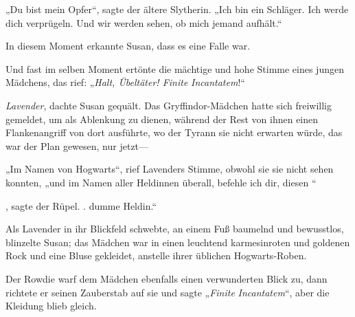 „Du bist mein Opfer“, sagte der ältere Slytherin. „Ich bin ein Schläger. Ich werde dich verprügeln. Und wir werden sehen, ob mich jemand aufhält.“

In diesem Moment erkannte Susan, dass es eine Falle war.

Und fast im selben Moment ertönte die mächtige und hohe Stimme eines jungen Mädchens, das rief: „\emph{Halt, Übeltäter! Finite} \emph{Incantatem}!“

\emph{Lavender}, dachte Susan gequält. Das Gryffindor-Mädchen hatte sich freiwillig gemeldet, um als Ablenkung zu dienen, während der Rest von ihnen einen Flankenangriff von dort ausführte, wo der Tyrann sie nicht erwarten würde, das war der Plan gewesen, nur jetzt—

„Im Namen von Hogwarts“, rief Lavenders Stimme, obwohl sie sie nicht sehen konnten, „und im Namen aller Heldinnen überall, befehle ich dir, diesen “

, sagte der Rüpel. .  dumme Heldin.“

Als Lavender in ihr Blickfeld schwebte, an einem Fuß baumelnd und bewusstlos, blinzelte Susan; das Mädchen war in einen leuchtend karmesinroten und goldenen Rock und eine Bluse gekleidet, anstelle ihrer üblichen Hogwarts-Roben.

Der Rowdie warf dem Mädchen ebenfalls einen verwunderten Blick zu, dann richtete er seinen Zauberstab auf sie und sagte „\emph{Finite} \emph{Incantatem}“, aber die Kleidung blieb gleich.

